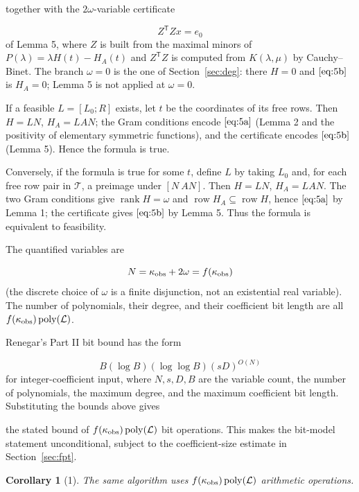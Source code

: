 \documentclass[journal]{IEEEtran}
\theoremstyle{plainn}
\newtheorem*{cor}{Corollary}
\theoremstyle{remark}
\begin{document}
together with the $2\omega$-variable certificate

\begin{equation}
Z^{\mathsf T}Zx=e_0
\end{equation}
of Lemma 5, where $Z$ is built from the maximal minors of $P(\lambda)=\lambda H(t)-H_A(t)$ and $Z^{\mathsf T}Z$ is computed from $K(\lambda,\mu)$ by Cauchy--Binet. The branch $\omega=0$ is the one of Section~\ref{sec:deg}: there $H=0$ and $\eqref{eq:5b}$ is $H_A=0$; Lemma 5 is not applied at $\omega=0$.

If a feasible $L=[L_0;R]$ exists, let $t$ be the coordinates of its free rows. Then $H=LN$, $H_A=LAN$; the Gram conditions encode $\eqref{eq:5a}$ (Lemma 2 and the positivity of elementary symmetric functions), and the certificate encodes $\eqref{eq:5b}$ (Lemma 5). Hence the formula is true.

Conversely, if the formula is true for some $t$, define $L$ by taking $L_0$ and, for each free row pair in $\mathcal T$, a preimage under $[N\ AN]$. Then $H=LN$, $H_A=LAN$. The two Gram conditions give $\operatorname{rank}H=\omega$ and $\operatorname{row}H_A\subseteq \operatorname{row}H$, hence $\eqref{eq:5a}$ by Lemma 1; the certificate gives $\eqref{eq:5b}$ by Lemma 5. Thus the formula is equivalent to feasibility.

The quantified variables are

\begin{equation}
N=\kappa_{\rm obs}+2\omega=f(\kappa_{\rm obs})
\end{equation}
(the discrete choice of $\omega$ is a finite disjunction, not an existential real variable). The number of polynomials, their degree, and their coefficient bit length are all $f(\kappa_{\rm obs})\operatorname{poly}(\mathcal L)$.

Renegar's Part II bit bound has the form

\begin{equation}
B(\log B)(\log\log B)(sD)^{O(N)}
\end{equation}
for integer-coefficient input, where $N,s,D,B$ are the variable count, the number of polynomials, the maximum degree, and the maximum coefficient bit length. Substituting the bounds above gives

the stated bound of $f(\kappa_{\rm obs})\operatorname{poly}(\mathcal L)$ bit operations. This makes the bit-model statement unconditional, subject to the coefficient-size estimate in Section~\ref{sec:fpt}.

\begin{cor}[1] The same algorithm uses $f(\kappa_{\rm obs})\operatorname{poly}(\mathcal L)$ arithmetic operations.
\end{cor}
\end{document}
